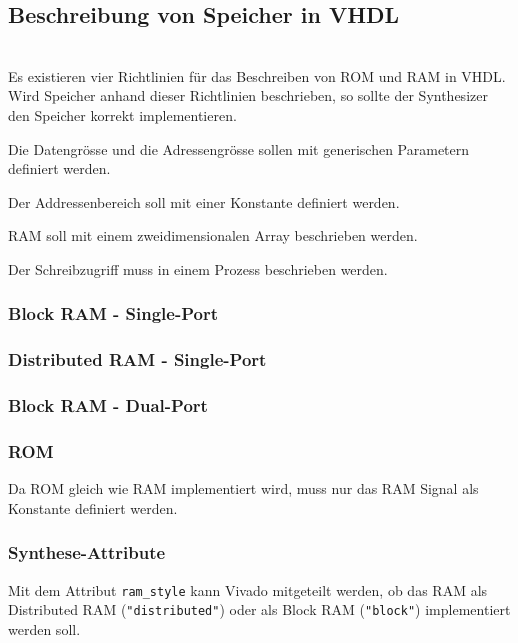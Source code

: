 \subsection{Beschreibung von Speicher in VHDL}$~$\\
Es existieren vier Richtlinien für das Beschreiben von ROM und RAM in VHDL. Wird Speicher anhand dieser Richtlinien beschrieben, so sollte der Synthesizer den Speicher korrekt implementieren.
\begin{compactenum}
    \item Die Datengrösse und die Adressengrösse sollen mit generischen Parametern definiert werden.
    \item Der Addressenbereich soll mit einer Konstante definiert werden.
    \item RAM soll mit einem zweidimensionalen Array beschrieben werden.
    \item Der Schreibzugriff muss in einem Prozess beschrieben werden.
\end{compactenum}

\subsubsection{Block RAM - Single-Port}


\subsubsection{Distributed RAM - Single-Port}


\subsubsection{Block RAM - Dual-Port}


\subsubsection{ROM}
Da ROM gleich wie RAM implementiert wird, muss nur das RAM Signal als Konstante definiert werden.


\subsubsection{Synthese-Attribute}
Mit dem Attribut \texttt{ram\_style} kann Vivado mitgeteilt werden, ob das RAM als Distributed RAM (\texttt{"distributed"}) oder als Block RAM (\texttt{"block"}) implementiert werden soll.



